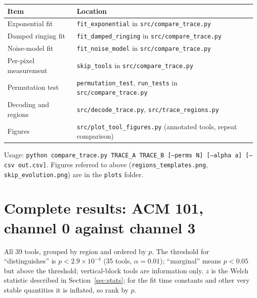 \documentclass[11pt]{article}
\newcommand{\code}[1]{\texttt{#1}}
\begin{document}
\begin{center}
\begin{tabular}{ll}
\toprule
Item & Location \\
\midrule
Exponential fit        & \code{fit\_exponential} in \code{src/compare\_trace.py} \\
Damped ringing fit     & \code{fit\_damped\_ringing} in \code{src/compare\_trace.py} \\
Noise-model fit        & \code{fit\_noise\_model} in \code{src/compare\_trace.py} \\
Per-pixel measurement  & \code{skip\_tools} in \code{src/compare\_trace.py} \\
Permutation test       & \code{permutation\_test}, \code{run\_tests} in \code{src/compare\_trace.py} \\
Decoding and regions   & \code{src/decode\_trace.py}, \code{src/trace\_regions.py} \\
Figures                & \code{src/plot\_tool\_figures.py} (annotated tools, repeat comparison) \\
\bottomrule
\end{tabular}
\end{center}

\noindent Usage: \code{python compare\_trace.py TRACE\_A TRACE\_B [--perms N] [--alpha a] [--csv out.csv]}.
Figures referred to above (\code{regions\_templates.png}, \code{skip\_evolution.png}) are in the
\code{plots} folder.

\appendix
\section{Complete results: ACM 101, channel 0 against channel 3}

All 39 tools, grouped by region and ordered by $p$. The threshold for ``distinguishes'' is
$p<2.9\times10^{-4}$ (35 tools, $\alpha=0.01$); ``marginal'' means $p<0.05$ but above the threshold;
vertical-block tools are information only. $z$ is the Welch statistic described in Section~\ref{sec:stats};
for the fit time constants and other very stable quantities it is inflated, so rank by $p$.
\end{document}

